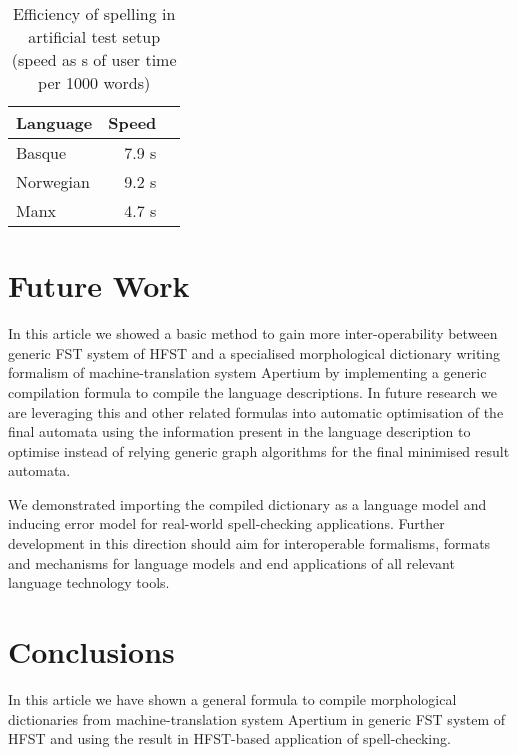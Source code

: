 \documentclass[10pt,a4paper]{article}
\begin{document}
\begin{table}[h]
\begin{center}
\begin{tabular}{|l|r|r|}
\hline
\bf Language & \bf Speed  \\
\hline
Basque       &  7.9 s\\
Norwegian    &  9.2 s\\
Manx         &  4.7 s\\
\hline
\end{tabular}
\caption{Efficiency of spelling in artificial test setup (speed as s of user
time per 1000 words)
\label{table:spelling}}
\end{center}
\end{table}

\section{Future Work}
\label{sec:future}

In this article we showed a basic method to gain more inter-operability between
generic FST system of HFST and a specialised morphological dictionary writing
formalism of machine-translation system Apertium by implementing a generic
compilation formula to compile the language descriptions. In future research
we are leveraging this and other related formulas into automatic optimisation
of the final automata using the information present in the language description
to optimise instead of relying generic graph algorithms for the final minimised
result automata.
 
We demonstrated importing the compiled dictionary as a language model and
inducing error model for real-world spell-checking applications. Further
development in this direction should aim for interoperable formalisms, formats
and mechanisms for language models and end applications of all relevant
language technology tools.

\section{Conclusions}
\label{sec:conclusions}

In this article we have shown a general formula to compile morphological
dictionaries from machine-translation system Apertium in generic FST system of
HFST and using the result in HFST-based application of spell-checking.





\end{document}
